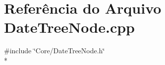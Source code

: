 \section{Referência do Arquivo Date\+Tree\+Node.\+cpp}
\label{_date_tree_node_8cpp}
{\ttfamily \#include \char`\"{}Core/\+Date\+Tree\+Node.\+h\char`\"{}}\\*
